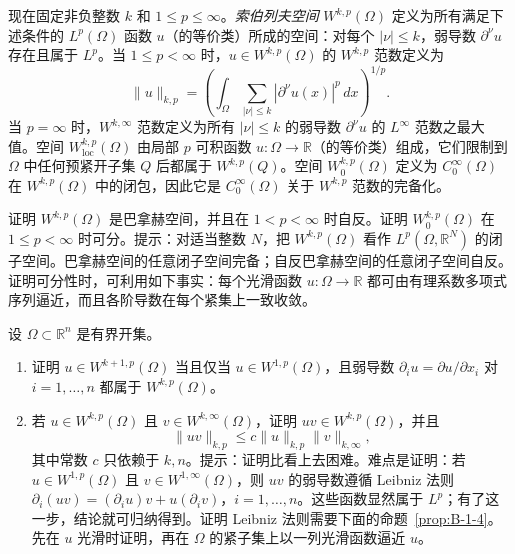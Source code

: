 现在固定非负整数 $k$ 和 $1\le p\le\infty$。\emph{索伯列夫空间} $W^{k,p}(\Omega)$ 定义为所有满足下述条件的 $L^p(\Omega)$ 函数 $u$（的等价类）所成的空间：对每个 $|\nu|\le k$，弱导数 $\partial^\nu u$ 存在且属于 $L^p$。当 $1\le p<\infty$ 时，$u\in W^{k,p}(\Omega)$ 的 $W^{k,p}$ 范数定义为
\[
  \|u\|_{k,p}=\left(\int_\Omega\sum_{|\nu|\le k}|\partial^\nu u(x)|^p\,dx\right)^{1/p}.
\]
当 $p=\infty$ 时，$W^{k,\infty}$ 范数定义为所有 $|\nu|\le k$ 的弱导数 $\partial^\nu u$ 的 $L^\infty$ 范数之最大值。空间 $W^{k,p}_{\mathrm{loc}}(\Omega)$ 由局部 $p$ 可积函数 $u:\Omega\to\mathbb R$（的等价类）组成，它们限制到 $\Omega$ 中任何预紧开子集 $Q$ 后都属于 $W^{k,p}(Q)$。空间 $W^{k,p}_0(\Omega)$ 定义为 $C_0^\infty(\Omega)$ 在 $W^{k,p}(\Omega)$ 中的闭包，因此它是 $C_0^\infty(\Omega)$ 关于 $W^{k,p}$ 范数的完备化。

\begin{exercise}\label{ex:B-1-1}
证明 $W^{k,p}(\Omega)$ 是巴拿赫空间，并且在 $1<p<\infty$ 时自反。证明 $W^{k,p}_0(\Omega)$ 在 $1\le p<\infty$ 时可分。提示：对适当整数 $N$，把 $W^{k,p}(\Omega)$ 看作 $L^p(\Omega,\mathbb R^N)$ 的闭子空间。巴拿赫空间的任意闭子空间完备；自反巴拿赫空间的任意闭子空间自反。证明可分性时，可利用如下事实：每个光滑函数 $u:\Omega\to\mathbb R$ 都可由有理系数多项式序列逼近，而且各阶导数在每个紧集上一致收敛。
\end{exercise}
\begin{exercise}\label{ex:B-1-2}
设 $\Omega\subset\mathbb R^n$ 是有界开集。
\begin{enumerate}[label=(\roman*)]
\item 证明 $u\in W^{k+1,p}(\Omega)$ 当且仅当 $u\in W^{1,p}(\Omega)$，且弱导数 $\partial_i u=\partial u/\partial x_i$ 对 $i=1,\ldots,n$ 都属于 $W^{k,p}(\Omega)$。
\item 若 $u\in W^{k,p}(\Omega)$ 且 $v\in W^{k,\infty}(\Omega)$，证明 $uv\in W^{k,p}(\Omega)$，并且
\[
  \|uv\|_{k,p}\le c\|u\|_{k,p}\|v\|_{k,\infty},
\]
其中常数 $c$ 只依赖于 $k,n$。提示：证明比看上去困难。难点是证明：若 $u\in W^{1,p}(\Omega)$ 且 $v\in W^{1,\infty}(\Omega)$，则 $uv$ 的弱导数遵循 Leibniz 法则
$\partial_i(uv)=(\partial_i u)v+u(\partial_i v)$，$i=1,\ldots,n$。这些函数显然属于 $L^p$；有了这一步，结论就可归纳得到。证明 Leibniz 法则需要下面的命题~\ref{prop:B-1-4}。先在 $u$ 光滑时证明，再在 $\Omega$ 的紧子集上以一列光滑函数逼近 $u$。
\end{enumerate}
\end{exercise}

